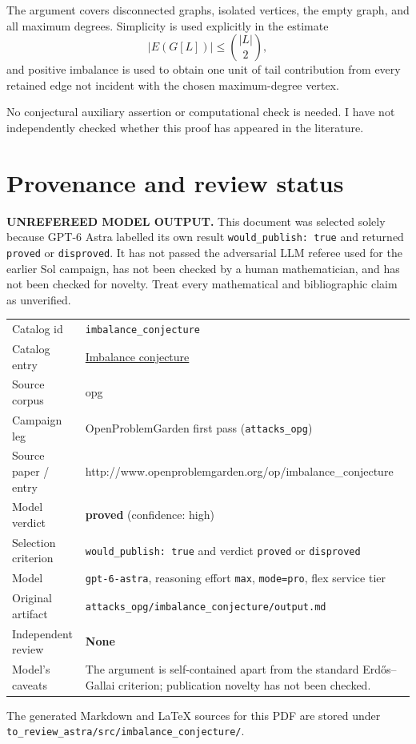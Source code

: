 \documentclass[
  11pt,
  a4paper,
]{article}
\newcounter{none} %
\begin{document}
The argument covers disconnected graphs, isolated vertices, the empty
graph, and all maximum degrees. Simplicity is used explicitly in the
estimate \[
|E(G[L])|\le\binom{|L|}{2},
\] and positive imbalance is used to obtain one unit of tail
contribution from every retained edge not incident with the chosen
maximum-degree vertex.

No conjectural auxiliary assertion or computational check is needed. I
have not independently checked whether this proof has appeared in the
literature.

\appendix

\section{Provenance and review
status}\label{provenance-and-review-status}

\begin{warning}

\textbf{UNREFEREED MODEL OUTPUT.} This document was selected solely
because GPT-6 Astra labelled its own result
\texttt{would\_publish:\ true} and returned \texttt{proved} or
\texttt{disproved}. It has not passed the adversarial LLM referee used
for the earlier Sol campaign, has not been checked by a human
mathematician, and has not been checked for novelty. Treat every
mathematical and bibliographic claim as unverified.

\end{warning}

{\def\LTcaptype{none} %
\begin{longtable}[]{@{}
  >{\raggedright\arraybackslash}p{}
  >{\raggedright\arraybackslash}p{}@{}}
\toprule\noalign{}
\endhead
\bottomrule\noalign{}
\endlastfoot
Catalog id & \texttt{imbalance\_conjecture} \\
Catalog entry &
\href{https://graph-theory-ai.github.io/graph-conjectures/op/imbalance_conjecture/}{Imbalance
conjecture} \\
Source corpus & opg \\
Campaign leg & OpenProblemGarden first pass (\texttt{attacks\_opg}) \\
Source paper / entry &
http://www.openproblemgarden.org/op/imbalance\_conjecture \\
Model verdict & \textbf{proved} (confidence: high) \\
Selection criterion & \texttt{would\_publish:\ true} and verdict
\texttt{proved} or \texttt{disproved} \\
Model & \texttt{gpt-6-astra}, reasoning effort \texttt{max},
\texttt{mode=pro}, flex service tier \\
Original artifact &
\texttt{attacks\_opg/imbalance\_conjecture/output.md} \\
Independent review & \textbf{None} \\
Model's caveats & The argument is self-contained apart from the standard
Erdős--Gallai criterion; publication novelty has not been checked. \\
\end{longtable}
}

The generated Markdown and LaTeX sources for this PDF are stored under
\texttt{to\_review\_astra/src/imbalance\_conjecture/}.
\end{document}
